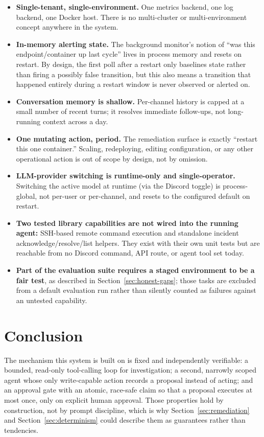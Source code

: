 \documentclass[11pt]{article}
\begin{document}
\begin{itemize}
  \item \textbf{Single-tenant, single-environment.} One metrics backend, one
    log backend, one Docker host. There is no multi-cluster or
    multi-environment concept anywhere in the system.
  \item \textbf{In-memory alerting state.} The background monitor's notion
    of ``was this endpoint/container up last cycle'' lives in process
    memory and resets on restart. By design, the first poll after a
    restart only baselines state rather than firing a possibly false
    transition, but this also means a transition that happened entirely
    during a restart window is never observed or alerted on.
  \item \textbf{Conversation memory is shallow.} Per-channel history is
    capped at a small number of recent turns; it resolves immediate
    follow-ups, not long-running context across a day.
  \item \textbf{One mutating action, period.} The remediation surface is
    exactly ``restart this one container.'' Scaling, redeploying, editing
    configuration, or any other operational action is out of scope by
    design, not by omission.
  \item \textbf{LLM-provider switching is runtime-only and single-operator.}
    Switching the active model at runtime (via the Discord toggle) is
    process-global, not per-user or per-channel, and resets to the
    configured default on restart.
  \item \textbf{Two tested library capabilities are not wired into the
    running agent:} SSH-based remote command execution and standalone
    incident acknowledge/resolve/list helpers. They exist with their own
    unit tests but are reachable from no Discord command, API route, or
    agent tool set today.
  \item \textbf{Part of the evaluation suite requires a staged environment
    to be a fair test}, as described in Section~\ref{sec:honest-gaps}; those
    tasks are excluded from a default evaluation run rather than silently
    counted as failures against an untested capability.
\end{itemize}

\section{Conclusion}

The mechanism this system is built on is fixed and independently verifiable:
a bounded, read-only tool-calling loop for investigation; a second, narrowly
scoped agent whose only write-capable action records a proposal instead of
acting; and an approval gate with an atomic, race-safe claim so that a
proposal executes at most once, only on explicit human approval. Those
properties hold by construction, not by prompt discipline, which is why
Section~\ref{sec:remediation} and Section~\ref{sec:determinism} could
describe them as guarantees rather than tendencies.
\end{document}
